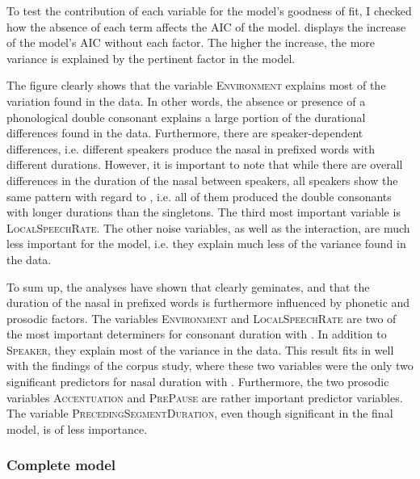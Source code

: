 To test the contribution of each variable for the model's goodness of fit, I checked how the absence of each term affects the AIC of the model.  displays the increase of the model's AIC  without each factor. The higher the increase, the more variance is explained by the pertinent factor in the model.



The figure clearly shows that the variable \textsc{Environment} explains most of the variation found in the data. In other words, the absence or presence of a phonological double consonant explains a large portion of the durational differences found in the data.
Furthermore, there are speaker-dependent differences, i.e. different speakers produce the nasal in prefixed words with different durations. However, it is important to note that while there are overall differences in the duration of the nasal between speakers, all speakers show the same pattern with regard to , i.e. all of them produced the double consonants with longer durations than the singletons. 
The third most important variable is \textsc{LocalSpeechRate}. The other noise variables, as well as the interaction, are much less important for the model, i.e. they explain much less of the variance found in the data.


To sum up, the analyses have shown that  clearly geminates, and that the duration of the nasal in prefixed words is furthermore influenced by phonetic and prosodic factors.
The variables \textsc{Environment} and \textsc{LocalSpeechRate} are two of the most important determiners for consonant duration with . In addition to \textsc{Speaker}, they explain most of the variance in the data. This result fits in well with the findings of the corpus study, where these two variables were the only two significant predictors for nasal duration with . 
Furthermore, the two prosodic variables \textsc{Accentuation} and \textsc{PrePause} are rather important predictor variables. The variable \textsc{PrecedingSegmentDuration}, even though significant in the final model, is of less importance. 



\subsubsection{Complete model}

